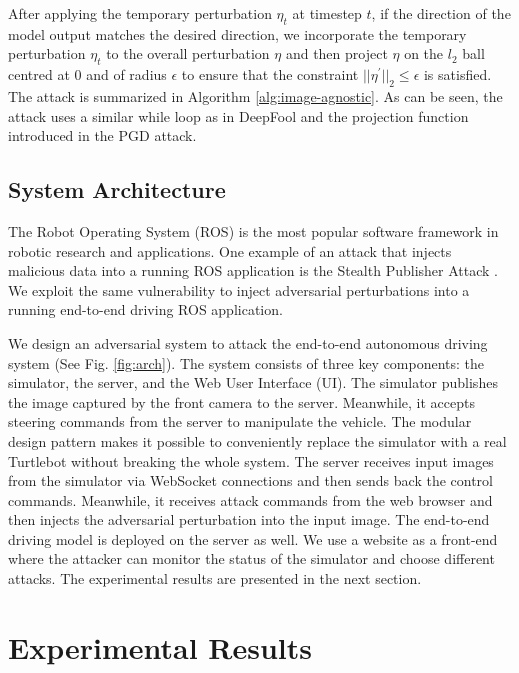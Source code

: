 After applying the temporary perturbation $\eta_{t}$ at timestep $t$, if the direction of the model output matches the desired direction, we incorporate the temporary perturbation $\eta_{t}$ to the overall perturbation $\eta$ and then project $\eta$ on the $l_2$ ball centred at 0 and of radius $\epsilon$ to ensure that the constraint $||{\eta}^{'}||_{2} \leq \epsilon$ is satisfied. The attack is summarized in Algorithm \ref{alg:image-agnostic}. As can be seen, the attack uses a similar while loop as in DeepFool and the projection function introduced in the PGD attack.


\subsection{System Architecture}

The Robot Operating System (ROS) \citep{ros} is the most popular software framework in robotic research and applications. One example of an attack that
injects malicious data into a running ROS application is the Stealth Publisher Attack \citep{dieber2020penetration}. We exploit the same vulnerability to inject adversarial perturbations into a running end-to-end driving ROS application.

We design an adversarial system to attack the end-to-end autonomous driving system (See Fig. \ref{fig:arch}). The system consists of three key components: the simulator, the server, and the Web User Interface (UI). The simulator publishes the image captured by the front camera to the server. Meanwhile, it accepts steering commands from the server to manipulate the vehicle. The modular design pattern makes it possible to conveniently replace the simulator with a real Turtlebot without breaking the whole system. The server receives input images from the simulator via WebSocket connections and then sends back the control commands. Meanwhile, it receives attack commands from the web browser and then injects the adversarial perturbation into the input image. The end-to-end driving model is deployed on the server as well. We use a website as a front-end where the attacker can monitor the status of the simulator and choose different attacks.
The experimental results are presented in the next section.


\section{Experimental Results}

